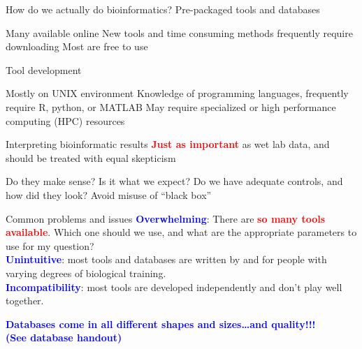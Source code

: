 \documentclass{beamer}
\renewcommand{\c}[1]{\begin{center}#1\end{center}}
\newcommand{\blu}[1]{\textcolor{blue}{\textbf{#1}}}
\newcommand{\red}[1]{\textcolor{red}{\textbf{#1}}}
\begin{document}
\begin{frame}{How do we actually do bioinformatics?}
Pre-packaged tools and databases
\begin{outline}
    \1[] Many available online
    \1[] New tools and time consuming methods frequently require downloading
    \1[] Most are free to use
\end{outline}

Tool development
\begin{outline}
    \1[] Mostly on UNIX environment
    \1[] Knowledge of programming languages, frequently require R, python, or MATLAB
    \1[] May require specialized or high performance computing (HPC) resources
\end{outline}

\end{frame}

\begin{frame}{Interpreting bioinformatic results}
\red{Just as important} as wet lab data, and should be treated with equal skepticism
\begin{outline}
    \1[] Do they make sense?
    \1[] Is it what we expect?
    \1[] Do we have adequate controls, and how did they look?
    \1[] Avoid misuse of “black box”
\end{outline}
\end{frame}

\begin{frame}{Common problems and issues}
    \blu{Overwhelming}: There are \red{so many tools available}. Which one should we use, and what are the appropriate parameters to use for my question?\\
    \bigskip
    \blu{Unintuitive}: most tools and databases are written by and for people with varying degrees of biological training.\\
    \bigskip
    \blu{Incompatibility}: most tools are developed independently and don’t play well together.
\end{frame}

\begin{frame}{}
\c{
    \huge \blu{Databases come in all different shapes and sizes\ldots and quality!!!\\
    \bigskip
    \large (See database handout)}
}
\end{frame}
\end{document}
